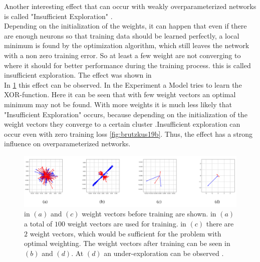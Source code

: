 Another interesting effect that can occur with weakly overparameterized networks is called "Insufficient Exploration" \cite{pmlr-v97-brutzkus19b}. \\
 Depending on the initialization of the weights, it can happen that even if there are enough neurons so that training data should be learned perfectly, a local minimum is found by the optimization algorithm, which still leaves the network with a non zero training error. So at least a few weight are not converging to where it should for better performance during the training process. this is called insufficient exploration. The effect was shown in \cite{pmlr-v97-brutzkus19b}\\
In \ref{fig:XOR-problem} this effect can be observed. In the Experiment a Model tries to learn the XOR-function. Here it can be seen that with few weight vectors an optimal minimum may not be found. With more weights it is much less likely that "Insufficient Exploration" occurs, because depending on the initialization of the weight vectors they converge to a certain cluster \cite{pmlr-v97-brutzkus19b}.Insufficient exploration can occur even with zero training loss \ref{fig:brutzkus19b}. Thus, the effect has a strong influence on overparameterized networks.

\begin{figure}[!htp]
\centering
\includegraphics[scale=0.2]{Abschlussarbeit_2021/LaTeX/images/XORD.PNG}
\caption{in $(a)$ and $(c)$ weight vectors before training are shown. in $(a)$ a total of $100$ weight vectors are used for training. in $(c)$ there are $2$ weight vectors, which would be sufficient for the problem with optimal weighting. The weight vectors after training can be seen in $(b)$ and $(d)$. At $(d)$ an under-exploration can be observed \cite{pmlr-v97-brutzkus19b}.}
\label{fig:XOR-problem}
\end{figure}




